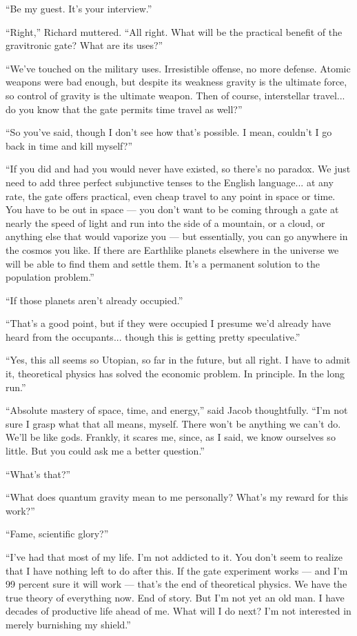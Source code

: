 \documentclass[english,11pt,letterpaper,onecolumn]{scrbook}
\begin{document}
	``Be my guest.  It's your interview.''

	``Right,'' Richard muttered.  ``All right.  What will be the practical benefit of the gravitronic gate?  What are its uses?''

	``We've touched on the military uses.  Irresistible offense, no more defense.  Atomic weapons were bad enough, but despite its weakness gravity is the ultimate force, so control of gravity is the ultimate weapon.  Then of course, interstellar travel... do you know that the gate permits time travel as well?''

	``So you've said, though I don't see how that's possible.  I mean, couldn't I go back in time and kill myself?''

	``If you did and had you would never have existed, so there's no paradox.  We just need to add three perfect subjunctive tenses to the English language... at any rate, the gate offers practical, even cheap travel to any point in space or time.  You have to be out in space --- you don't want to be coming through a gate at nearly the speed of light and run into the side of a mountain, or a cloud, or anything else that would vaporize you --- but essentially, you can go anywhere in the cosmos you like.  If there are Earthlike planets elsewhere in the universe we will be able to find them and settle them.  It's a permanent solution to the population problem.''

	``If those planets aren't already occupied.''

	``That's a good point, but if they were occupied I presume we'd already have heard from the occupants... though this is getting pretty speculative.''

	``Yes, this all seems so Utopian, so far in the future, but all right.  I have to admit it, theoretical physics has solved the economic problem.  In principle.  In the long run.''

	``Absolute mastery of space, time, and energy,'' said Jacob thoughtfully.  ``I'm not sure I grasp what that all means, myself.  There won't be anything we can't do.  We'll be like gods.  Frankly, it scares me, since, as I said, we know ourselves so little.  But you could ask me a better question.''

	``What's that?''

	``What does quantum gravity mean to me personally?  What's my reward for this work?''

	``Fame, scientific glory?''

	``I've had that most of my life.  I'm not addicted to it.  You don't seem to realize that I have nothing left to do after this.  If the gate experiment works --- and I'm 99 percent sure it will work --- that's the end of theoretical physics.  We have the true theory of everything now.  End of story.  But I'm not yet an old man.  I have decades of productive life ahead of me.  What will I do next?  I'm not interested in merely burnishing my shield.''
\end{document}
